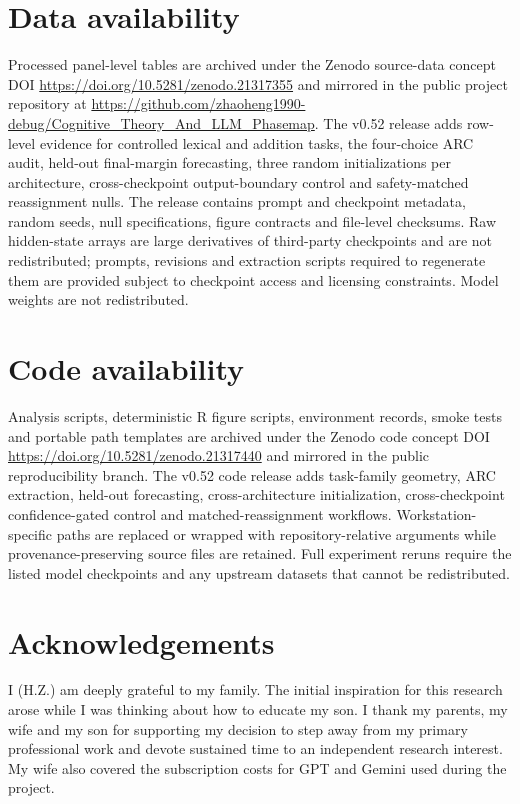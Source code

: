 \documentclass[11pt]{article}
\begin{document}
{\setlength{\parindent}{0pt}
\section{Data availability}
Processed panel-level tables are archived under the Zenodo source-data concept DOI \url{https://doi.org/10.5281/zenodo.21317355} and mirrored in the public project repository at \url{https://github.com/zhaoheng1990-debug/Cognitive_Theory_And_LLM_Phasemap}. The v0.52 release adds row-level evidence for controlled lexical and addition tasks, the four-choice ARC audit, held-out final-margin forecasting, three random initializations per architecture, cross-checkpoint output-boundary control and safety-matched reassignment nulls. The release contains prompt and checkpoint metadata, random seeds, null specifications, figure contracts and file-level checksums. Raw hidden-state arrays are large derivatives of third-party checkpoints and are not redistributed; prompts, revisions and extraction scripts required to regenerate them are provided subject to checkpoint access and licensing constraints. Model weights are not redistributed.

\section{Code availability}
Analysis scripts, deterministic R figure scripts, environment records, smoke tests and portable path templates are archived under the Zenodo code concept DOI \url{https://doi.org/10.5281/zenodo.21317440} and mirrored in the public reproducibility branch. The v0.52 code release adds task-family geometry, ARC extraction, held-out forecasting, cross-architecture initialization, cross-checkpoint confidence-gated control and matched-reassignment workflows. Workstation-specific paths are replaced or wrapped with repository-relative arguments while provenance-preserving source files are retained. Full experiment reruns require the listed model checkpoints and any upstream datasets that cannot be redistributed.

\section{Acknowledgements}
I (H.Z.) am deeply grateful to my family. The initial inspiration for this research arose while I was thinking about how to educate my son. I thank my parents, my wife and my son for supporting my decision to step away from my primary professional work and devote sustained time to an independent research interest. My wife also covered the subscription costs for GPT and Gemini used during the project.

}
\end{document}
